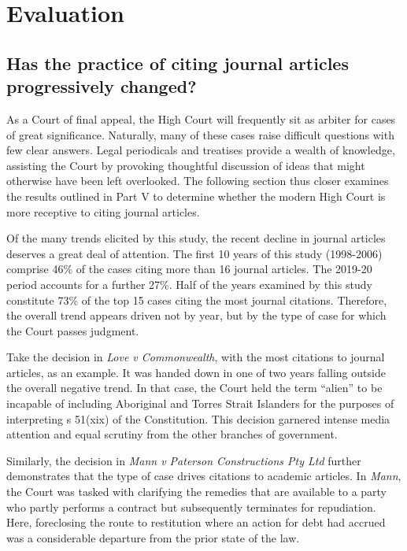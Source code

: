 \let\xn\xnote
\section{Evaluation}

\subsection{Has the practice of citing journal articles progressively changed?}

As a Court of final appeal, the High Court will frequently sit as arbiter for cases of great significance.\xn{6-1} Naturally, many of these cases raise difficult questions with few clear answers.\xn{6-2} Legal periodicals and treatises provide a wealth of knowledge, assisting the Court by provoking thoughtful discussion of ideas that might otherwise have been left overlooked. The following section thus closer examines the results outlined in Part V to determine whether the modern High Court is more receptive to citing journal articles.

Of the many trends elicited by this study, the recent decline in journal articles deserves a great deal of attention. The first 10 years of this study (1998-2006) comprise 46\% of the cases citing more than 16 journal articles. The 2019-20 period accounts for a further 27\%. Half of the years examined by this study constitute 73\% of the top 15 cases citing the most journal citations. Therefore, the overall trend appears driven not by year, but by the type of case for which the Court passes judgment.

Take the decision in \emph{Love v Commonwealth}, with the most citations to journal articles, as an example.\xn{6-3} It was handed down in one of two years falling outside the overall negative trend. In that case, the Court held the term ``alien'' to be incapable of including Aboriginal and Torres Strait Islanders for the purposes of interpreting s 51(xix) of the Constitution.\xn{6-4} This decision garnered intense media attention and equal scrutiny from the other branches of government.\xn{6-5} 

Similarly, the decision in \emph{Mann v Paterson Constructions Pty Ltd} further demonstrates that the type of case drives citations to academic articles.\xn{6-6} In \textit{Mann}, the Court was tasked with clarifying the remedies that are available to a party who partly performs a contract but subsequently terminates for repudiation.\xn{6-7} Here, foreclosing the route to restitution where an action for debt had accrued was a considerable departure from the prior state of the law.\xn{6-8} 

